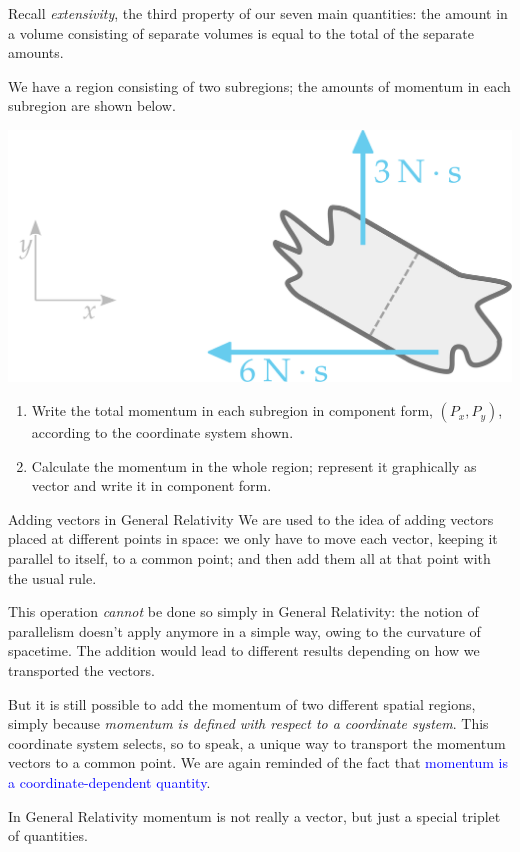 \documentclass[a4paper,12pt,%
onecolumn,oneside,%
british%
]{memoir}
\renewcommand*{\|}[1][]{\nonscript\:#1\vert\nonscript\:\mathopen{}}
\newcommand*{\sect}{\S}%
\renewcommand*{\autoref}[2]{\sidepar{\vspace{-1ex}\footnotesize{\color{blue}\faIcon{%
angle-right%
}\enspace\sect~\ref{#1} page~\pageref{#1}}}\textcolor{blue}{#2}}
\begin{document}
\bigskip


\begin{exercise}
  Recall \emph{extensivity}, the third property of our seven main quantities: the amount in a volume consisting of separate volumes is equal to the total of the separate amounts.

We have a region consisting of two subregions; the amounts of momentum in each subregion are shown below.
  \begin{center}
    \includegraphics[width=0.5\linewidth]{images/exercise_momentumsum.pdf}
  \end{center}
  \begin{enumerate}[exerc]
  \item Write the total momentum in each subregion in component form, $(P_{x}, P_{y})$, according to the coordinate system shown.
  \item Calculate the momentum in the whole region; represent it graphically as vector and write it in component form.
  \end{enumerate}
\end{exercise}

\begin{extra}{Adding vectors in General Relativity}
  We are used to the idea of adding vectors placed at different points in space: we only have to move each vector, keeping it parallel to itself, to a common point; and then add them all at that point with the usual rule.

  This operation \emph{cannot} be done so simply in General Relativity: the notion of parallelism doesn't apply anymore in a simple way, owing to the curvature of spacetime. The addition would lead to different results depending on how we transported the vectors.

  But it is still possible to add the momentum of two different spatial regions, simply because \emph{momentum is defined with respect to a coordinate system}. This coordinate system selects, so to speak, a unique way to transport the momentum vectors to a common point. We are again reminded of the fact that \autoref{sec:energy_momentum_angmomentum_coords}{momentum is a coordinate-dependent quantity}.

  In General Relativity momentum is not really a vector, but just a special triplet of quantities.

\end{extra}
\end{document}
